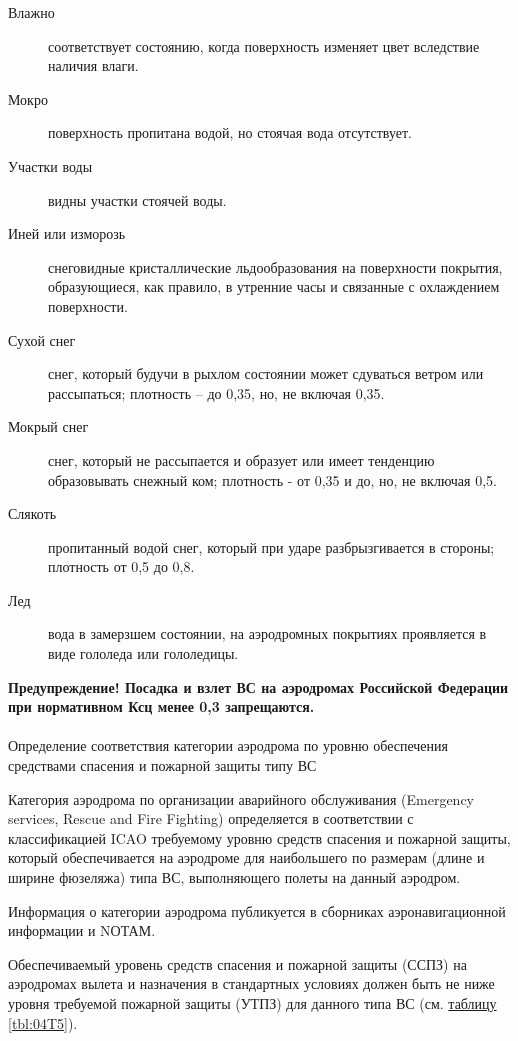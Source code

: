\begin{description}
    \item[Влажно] соответствует состоянию, когда поверхность изменяет цвет вследствие наличия влаги.
    \item[Мокро] поверхность пропитана водой, но стоячая вода отсутствует. 
    \item[Участки воды] видны участки стоячей воды.
    \item[Иней или изморозь] снеговидные кристаллические льдообразования на поверхности покрытия, образующиеся, как правило, в утренние часы и связанные с охлаждением поверхности. 
    \item[Сухой снег] снег, который будучи в рыхлом состоянии может сдуваться ветром или рассыпаться; плотность – до 0,35, но, не включая 0,35.
    \item[Мокрый снег] снег, который не рассыпается и образует или имеет тенденцию образовывать снежный ком; плотность - от 0,35 и до, но, не включая 0,5.
    \item[Слякоть] пропитанный водой снег, который при ударе разбрызгивается в стороны; плотность от 0,5 до 0,8.
    \item[Лед] вода в замерзшем состоянии, на аэродромных покрытиях проявляется в виде гололеда или гололедицы.
\end{description}

\textbf{Предупреждение! Посадка и взлет ВС на аэродромах Российской Федерации при нормативном Ксц менее 0,3 запрещаются.}

\paragraph{}Определение соответствия категории аэродрома по уровню обеспечения средствами спасения и пожарной защиты типу ВС

Категория аэродрома по организации аварийного обслуживания (Emergency services, Rescue and Fire Fighting) определяется в соответствии с классификацией ICAO требуемому уровню средств спасения и пожарной защиты, который обеспечивается на аэродроме для наибольшего по размерам (длине и ширине фюзеляжа) типа ВС, выполняющего полеты на данный аэродром.

Информация о категории аэродрома публикуется в сборниках аэронавигационной информации и NОТАМ.

Обеспечиваемый уровень средств спасения и пожарной защиты (ССПЗ) на аэродромах вылета и назначения в стандартных условиях должен быть не ниже уровня требуемой пожарной защиты (УТПЗ) для данного типа ВС (см. \hyperref[tbl:04T5]{таблицу \ref*{tbl:04T5}}).




